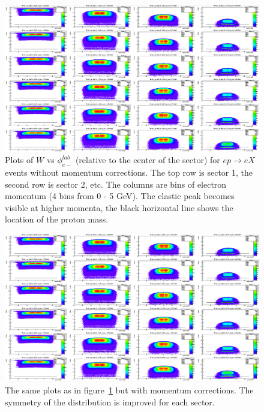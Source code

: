 %
\begin{figure}
\centering
\includegraphics[width=8.5in]{figures/WVphi_eX_without.png}
\caption{Plots of $W$ vs $\phi_{e-}^{lab}$ (relative to the center of the sector) for $ep \rightarrow eX$ events without momentum corrections. The top row is sector 1, the second row is sector 2, etc. The columns are bins of electron momentum (4 bins from 0 - 5 GeV). The elastic peak becomes visible at higher momenta, the black horizontal line shows the location of the proton mass.}
\label{fig:WVphi_eX_without}
\end{figure}
%
\begin{figure}
\centering
\includegraphics[width=8.5in]{figures/WVphi_eX_with.png}
\caption{The same plots as in figure~\ref{fig:WVphi_eX_without} but with momentum corrections. The symmetry of the distribution is improved for each sector.}
\label{fig:WVphi_eX_with}
\end{figure}

